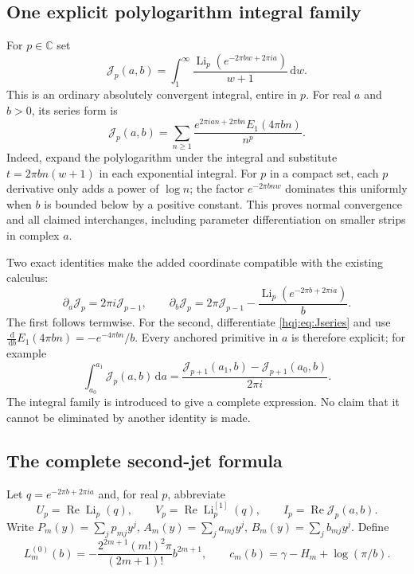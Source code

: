 \documentclass[11pt,letterpaper]{article}
\numberwithin{equation}{section}
\theoremstyle{definition}
\newcommand{\Li}{\operatorname{Li}}
\newcommand{\Rea}{\operatorname{Re}}
\newcommand{\dd}{\,\mathrm{d}}
\newcommand{\C}{\mathbb C}
\begin{document}
\subsection{One explicit polylogarithm integral family}
For $p\in\C$ set
\begin{equation}\label{hqj:eq:J}
\mathcal J_p(a,b)=\int_1^\infty
\frac{\Li_p(e^{-2\pi bw+2\pi ia})}{w+1}\dd w.
\end{equation}
This is an ordinary absolutely convergent integral, entire in $p$.
For real $a$ and $b>0$, its series form is
\begin{equation}\label{hqj:eq:Jseries}
\mathcal J_p(a,b)=\sum_{n\ge1}
\frac{e^{2\pi ian+2\pi bn}E_1(4\pi bn)}{n^p}.
\end{equation}
Indeed, expand the polylogarithm under the integral and substitute
$t=2\pi bn(w+1)$ in each exponential integral. For $p$ in a compact
set, each $p$ derivative only adds a power of $\log n$; the factor
$e^{-2\pi b n w}$ dominates this uniformly when $b$ is bounded below
by a positive constant. This proves normal convergence and all claimed
interchanges, including parameter differentiation on smaller strips in
complex $a$.

Two exact identities make the added coordinate compatible with the
existing calculus:
\begin{equation}\label{hqj:eq:J-calculus}
\partial_a\mathcal J_p=2\pi i\mathcal J_{p-1},\qquad
\partial_b\mathcal J_p=2\pi\mathcal J_{p-1}
-\frac{\Li_p(e^{-2\pi b+2\pi ia})}{b}.
\end{equation}
The first follows termwise. For the second, differentiate
\eqref{hqj:eq:Jseries} and use
$\frac{\dd}{\dd b}E_1(4\pi bn)=-e^{-4\pi bn}/b$.
Every anchored primitive in $a$ is therefore explicit; for example
\[
\int_{a_0}^{a_1}\mathcal J_p(a,b)\dd a
=\frac{\mathcal J_{p+1}(a_1,b)-\mathcal J_{p+1}(a_0,b)}{2\pi i}.
\]
The integral family is introduced to give a complete expression. No
claim that it cannot be eliminated by another identity is made.

\subsection{The complete second-jet formula}
Let $q=e^{-2\pi b+2\pi ia}$ and, for real $p$, abbreviate
\[
U_p=\Rea\Li_p(q),\qquad V_p=\Rea\Li_p^{[1]}(q),\qquad
I_p=\Rea\mathcal J_p(a,b).
\]
Write $P_m(y)=\sum_jp_{mj}y^j$, $A_m(y)=\sum_ja_{mj}y^j$,
$B_m(y)=\sum_jb_{mj}y^j$. Define
\begin{equation}\label{hqj:eq:Lzero}
L_m^{(0)}(b)=-\frac{2^{2m+1}(m!)^2\pi}{(2m+1)!}b^{2m+1},
\qquad c_m(b)=\gamma-H_m+\log(\pi/b).
\end{equation}
\end{document}
